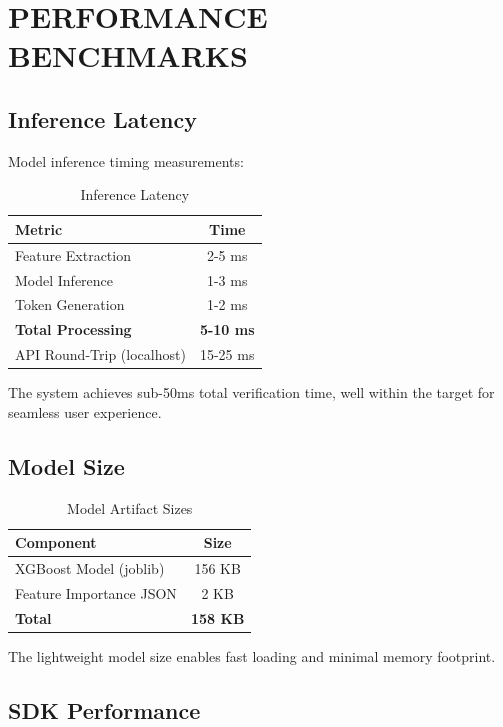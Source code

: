 \section{PERFORMANCE BENCHMARKS}

\subsection{Inference Latency}

Model inference timing measurements:

\begin{table}[H]
\centering
\caption{Inference Latency}
\label{tab:inference_time}
\begin{tabular}{|l|c|}
\hline
\textbf{Metric} & \textbf{Time} \\
\hline
Feature Extraction & 2-5 ms \\
\hline
Model Inference & 1-3 ms \\
\hline
Token Generation & 1-2 ms \\
\hline
\textbf{Total Processing} & \textbf{5-10 ms} \\
\hline
API Round-Trip (localhost) & 15-25 ms \\
\hline
\end{tabular}
\end{table}

The system achieves sub-50ms total verification time, well within the target for seamless user experience.

\subsection{Model Size}

\begin{table}[H]
\centering
\caption{Model Artifact Sizes}
\label{tab:model_size}
\begin{tabular}{|l|c|}
\hline
\textbf{Component} & \textbf{Size} \\
\hline
XGBoost Model (joblib) & 156 KB \\
\hline
Feature Importance JSON & 2 KB \\
\hline
\textbf{Total} & \textbf{158 KB} \\
\hline
\end{tabular}
\end{table}

The lightweight model size enables fast loading and minimal memory footprint.

\subsection{SDK Performance}

